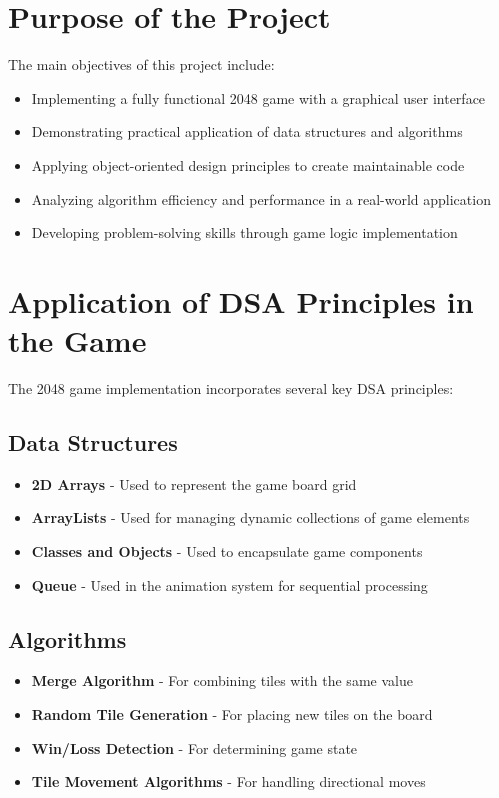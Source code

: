 \documentclass[12pt, a4paper]{article}
\begin{document}
\section{Purpose of the Project}
The main objectives of this project include:
\begin{itemize}
    \item Implementing a fully functional 2048 game with a graphical user interface
    \item Demonstrating practical application of data structures and algorithms
    \item Applying object-oriented design principles to create maintainable code
    \item Analyzing algorithm efficiency and performance in a real-world application
    \item Developing problem-solving skills through game logic implementation
\end{itemize}

\section{Application of DSA Principles in the Game}
The 2048 game implementation incorporates several key DSA principles:

\subsection{Data Structures}
\begin{itemize}
    \item \textbf{2D Arrays} - Used to represent the game board grid
    \item \textbf{ArrayLists} - Used for managing dynamic collections of game elements
    \item \textbf{Classes and Objects} - Used to encapsulate game components
    \item \textbf{Queue} - Used in the animation system for sequential processing
\end{itemize}

\subsection{Algorithms}
\begin{itemize}
    \item \textbf{Merge Algorithm} - For combining tiles with the same value
    \item \textbf{Random Tile Generation} - For placing new tiles on the board
    \item \textbf{Win/Loss Detection} - For determining game state
    \item \textbf{Tile Movement Algorithms} - For handling directional moves
\end{itemize}
\end{document}
